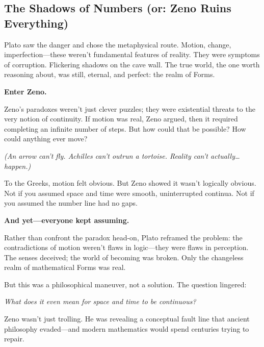 \subsection{The Shadows of Numbers (or: Zeno Ruins Everything)}

Plato saw the danger and chose the metaphysical route. Motion, change, imperfection—these weren’t fundamental features of reality. They were symptoms of corruption. Flickering shadows on the cave wall. The true world, the one worth reasoning about, was still, eternal, and perfect: the realm of Forms.

\textbf{Enter Zeno.}

Zeno’s paradoxes weren’t just clever puzzles; they were existential threats to the very notion of continuity. If motion was real, Zeno argued, then it required completing an infinite number of steps. But how could that be possible? How could anything ever move?

\textit{(An arrow can’t fly. Achilles can’t outrun a tortoise. Reality can’t actually… happen.)}

\vspace{0.5em} To the Greeks, motion felt obvious. But Zeno showed it wasn’t logically obvious. Not if you assumed space and time were smooth, uninterrupted continua.
Not if you assumed the number line had no gaps.

\textbf{And yet—everyone kept assuming.}

Rather than confront the paradox head-on, Plato reframed the problem: the contradictions of motion weren’t flaws in logic—they were flaws in perception. The senses deceived; the world of becoming was broken. Only the changeless realm of mathematical Forms was real.

But this was a philosophical maneuver, not a solution. The question lingered:

\textit{What does it even mean for space and time to be continuous?}

Zeno wasn’t just trolling. He was revealing a conceptual fault line that ancient philosophy evaded—and modern mathematics would spend centuries trying to repair.

